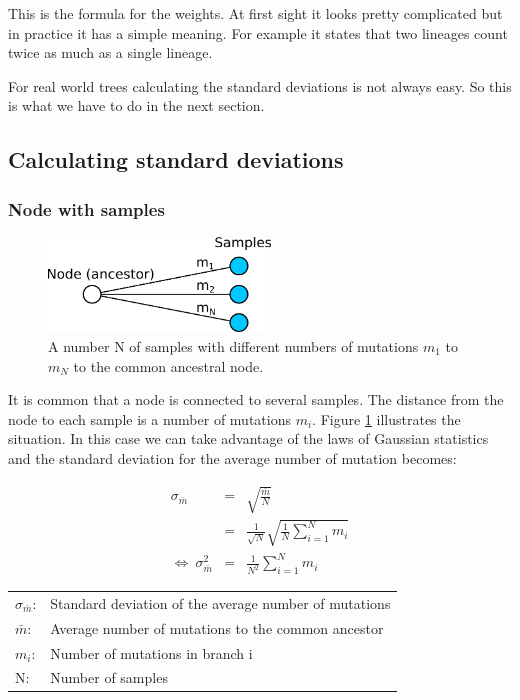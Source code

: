 This is the formula for the weights. At first sight it looks
pretty complicated but in practice it has a simple meaning. For
example it states that two lineages count twice as much as a
single lineage.

For real world trees calculating the standard deviations is
not always easy. So this is what we have to do in the next section.


\subsection{Calculating standard deviations}


\subsubsection*{Node with samples}

\begin{figure}[ht]
\centering
\includegraphics[width=5.9cm]{img/node_with_samples.png}
\caption{\label{node_with_samples} A number N of samples with different
numbers of mutations $m_1$ to $m_N$ to the common ancestral node.}
\end{figure}

It is common that a node is connected to several samples.
The distance from the node to each sample is a number of
mutations $m_i$. Figure \ref{node_with_samples} illustrates
the situation. In this case we can take advantage of the laws
of Gaussian statistics and the standard deviation for the
average number of mutation becomes:

\begin{eqnarray}
\sigma_{\bar{m}} & = & \sqrt{\frac{\bar{m}}{N}}\\
                 & = & \frac{1}{\sqrt{N}} \sqrt{\frac{1}{N} \sum_{i=1}^{N}m_i}\\
\Leftrightarrow\ \sigma_{\bar{m}}^2 & = & \frac{1}{N^2} \sum_{i=1}^{N}m_i
\end{eqnarray}

\begin{tabular}{ll}
$\sigma_{\bar{m}}$: &  Standard deviation of the average number of mutations\\
$\bar{m}$: & Average number of mutations to the common ancestor\\
$m_i$: &  Number of mutations in branch i\\
N: &  Number of samples
\end{tabular}
\vspace{1em}

